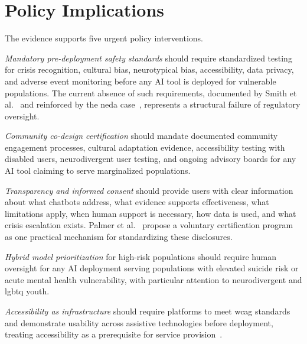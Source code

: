 \section{Policy Implications}

The evidence supports five urgent policy interventions.

\textit{Mandatory pre-deployment safety standards} should require standardized testing for crisis recognition, cultural bias, neurotypical bias, accessibility, data privacy, and adverse event monitoring before any AI tool is deployed for vulnerable populations. The current absence of such requirements, documented by Smith et al.~\cite{smith_2023} and reinforced by the \gls{neda} case~\cite{neda_2023}, represents a structural failure of regulatory oversight.

\textit{Community co-design certification} should mandate documented community engagement processes, cultural adaptation evidence, accessibility testing with disabled users, neurodivergent user testing, and ongoing advisory boards for any AI tool claiming to serve marginalized populations.

\textit{Transparency and informed consent} should provide users with clear information about what chatbots address, what evidence supports effectiveness, what limitations apply, when human support is necessary, how data is used, and what crisis escalation exists. Palmer et al.~\cite{palmer_2025} propose a voluntary certification program as one practical mechanism for standardizing these disclosures.

\textit{Hybrid model prioritization} for high-risk populations should require human oversight for any AI deployment serving populations with elevated suicide risk or acute mental health vulnerability, with particular attention to neurodivergent and \gls{lgbtq} youth.

\textit{Accessibility as infrastructure} should require platforms to meet \gls{wcag} standards and demonstrate usability across assistive technologies before deployment, treating accessibility as a prerequisite for service provision~\cite{khan_seo_2025}.
